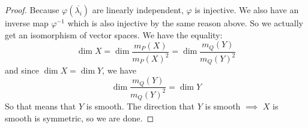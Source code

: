\documentclass{article}
\begin{document}
\begin{itemize}
\begin{proof}
                Because $\varphi ( \overline{\lambda_{ i}})$ are linearly independent, $\varphi$ is injective. We also have an inverse map $\varphi^{-1}$ which is also injective by the same reason above. So we actually get an isomorphism of vector spaces. We have the equality:
                    \begin{equation*}
                        \dim X = \dim\dfrac{ m_{P}(X)}{m_{P}(X)^{2}} = \dim\dfrac{ m_{Q}(Y)}{m_{Q}(Y)^{2}}
                    \end{equation*}
                and since $\dim X = \dim  Y$, we have
                    \begin{equation*}
                        \dim\dfrac{ m_{Q}(Y)}{m_{Q}(Y)^{2}} = \dim Y
                    \end{equation*}
                So that means that $Y$ is smooth. The direction that $Y$ is smooth $\implies$ $X$ is smooth is symmetric, so we are done.
            \end{proof}


\end{itemize}
\end{document}
